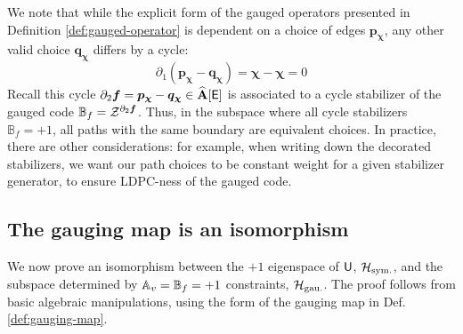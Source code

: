 \documentclass[11pt]{article}
\begin{document}
\begin{remark}

We note that while the explicit form of the gauged operators presented in Definition \ref{def:gauged-operator} is dependent on a choice of edges $\bm{p}_{\bm{\bm{\chi}}}$, any other valid choice $\bm{q}_{\bm{\bm{\chi}}}$ differs by a cycle: 
\begin{equation}
    \partial_1 (\bm{p}_{\bm{\bm{\chi}}} - \bm{q}_{\bm{\bm{\chi}}}) = \bm{\bm{\chi}} - \bm{\bm{\chi}} = 0 
\end{equation}
Recall this cycle $\partial_2 \bm{f} = \bm{p}_{\bm{\bm{\chi}}} - \bm{q}_{\bm{\bm{\chi}}} \in \widehat{\mathbf{A}}[\mathsf{E}]$ is associated to a cycle stabilizer of the gauged code $\mathbb{B}_f = \mathcal{Z}^{\partial_2 \bm{f}}$. Thus, in the subspace where all cycle stabilizers $\mathbb{B}_f = +1$, all paths with the same boundary are equivalent choices. In practice, there are other considerations: for example, when writing down the decorated stabilizers, we want our path choices to be constant weight for a given stabilizer generator, to ensure LDPC-ness of the gauged code.
\end{remark}


\subsection{The gauging map is an isomorphism}

We now prove an isomorphism between the $+1$ eigenspace of $\mathsf{U}$, $\mathcal{H}_{\rm{sym.}}$, and the subspace determined by $\mathbb{A}_v = \mathbb{B}_f = +1$ constraints, $\mathcal{H}_{\rm{gau.}}$. The proof follows from basic algebraic manipulations, using the form of the gauging map in Def. \ref{def:gauging-map}. 
\end{document}
